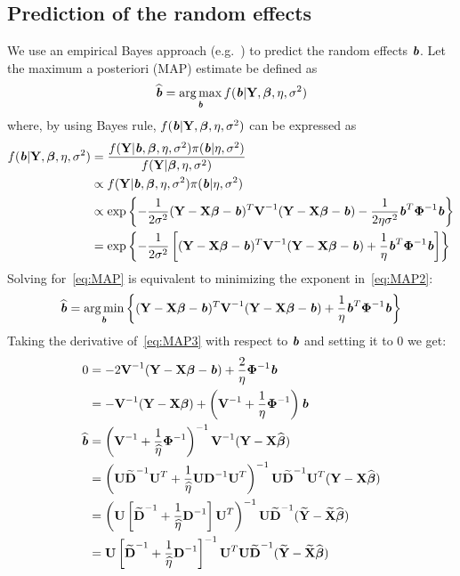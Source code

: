 \documentclass[12pt,letter]{article}\usepackage[]{graphicx}\usepackage[]{color}
\newcommand{\bX}{\textbf{X}}
\newcommand{\bY}{\textbf{Y}}
\newcommand{\bD}{\textbf{D}}
\newcommand{\bXtilde}{\widetilde{\bX}}
\newcommand{\bYtilde}{\widetilde{\bY}}
\newcommand{\bDtilde}{\widetilde{\bD}}
\newcommand{\bU}{\textbf{U}}
\newcommand{\bV}{\textbf{V}}
\newcommand{\bb}{\textbf{\emph{b}}}
\newcommand{\bbeta}{\boldsymbol{\beta}}
\newcommand{\bPhi}{\boldsymbol{\Phi}}
\DeclareMathOperator*{\argmin}{arg\,min}
\DeclareMathOperator*{\argmax}{arg\,max}
\begin{document}
\subsection{Prediction of the random effects}
We use an empirical Bayes approach (e.g.~\cite{wakefield2013bayesian}) to predict the random effects $\bb$. Let the maximum a posteriori (MAP) estimate be defined as
\begin{equation}
	\widehat{\bb} = \argmax_{\bb} f(\bb |  \bY, \bbeta, \eta, \sigma^2)  \label{eq:MAP}
\end{equation}
where, by using Bayes rule, $f(\bb |  \bY, \bbeta, \eta, \sigma^2)$ can be expressed as
\begin{align}
	f(\bb |  \bY, \bbeta, \eta, \sigma^2) & = \frac{f(\bY | \bb,  \bbeta, \eta, \sigma^2)  \pi(\bb | \eta, \sigma^2)}{f(\bY |  \bbeta, \eta, \sigma^2)} \nonumber \\
	& \propto f(\bY | \bb,  \bbeta, \eta, \sigma^2)  \pi(\bb | \eta, \sigma^2) \nonumber\\
	& \propto \exp \left\lbrace - \frac{1}{2 \sigma^2} (\bY - \bX \bbeta - \bb)^T \bV^{-1} (\bY - \bX \bbeta - \bb) - \frac{1}{2\eta \sigma^2}\bb^T \bPhi^{-1}\bb   \right \rbrace \nonumber\\
	& = \exp \left\lbrace - \frac{1}{2 \sigma^2} \left[  (\bY - \bX \bbeta - \bb)^T \bV^{-1} (\bY - \bX \bbeta - \bb) + \frac{1}{\eta }\bb^T \bPhi^{-1}\bb \right]    \right \rbrace \label{eq:MAP2}
\end{align}
Solving for~\eqref{eq:MAP} is equivalent to minimizing the exponent in~\eqref{eq:MAP2}:
\begin{align}
	\widehat{\bb} = \argmin_{\bb} \left\lbrace  (\bY - \bX \bbeta - \bb)^T \bV^{-1} (\bY - \bX \bbeta - \bb) + \frac{1}{\eta }\bb^T \bPhi^{-1}\bb \right\rbrace \label{eq:MAP3}
\end{align}
Taking the derivative of~\eqref{eq:MAP3} with respect to $\bb$ and setting it to 0 we get:
\begin{align}
	0 & = -2 \bV^{-1} (\bY - \bX \bbeta - \bb) + \frac{2}{\eta} \bPhi^{-1}\bb \nonumber \\
	& = -\bV^{-1}  (\bY - \bX \bbeta ) + \left(\bV^{-1} + \frac{1}{\eta}\bPhi^{-1}\right) \bb  \nonumber\\
	\widehat{\bb} & = \left(\bV^{-1} + \frac{1}{\widehat{\eta}}\bPhi^{-1}\right)^{-1}\bV^{-1}  (\bY - \bX \widehat{\bbeta} ) \nonumber \\
	& = \left(\bU \bDtilde^{-1} \bU^T + \frac{1}{\widehat{\eta}}\bU \bD^{-1} \bU^T\right)^{-1} \bU \bDtilde^{-1} \bU^T (\bY - \bX \widehat{\bbeta} ) \nonumber \\
	& = \left(\bU \left[\bDtilde^{-1} + \frac{1}{\widehat{\eta}} \bD^{-1} \right] \bU^T \right)^{-1} \bU \bDtilde^{-1} (\bYtilde - \bXtilde \widehat{\bbeta} ) \nonumber \\
	& = \bU \left[\bDtilde^{-1} + \frac{1}{\widehat{\eta}} \bD^{-1} \right]^{-1} \bU^T \bU \bDtilde^{-1} (\bYtilde - \bXtilde \widehat{\bbeta} ) \nonumber
\end{align}
\end{document}
